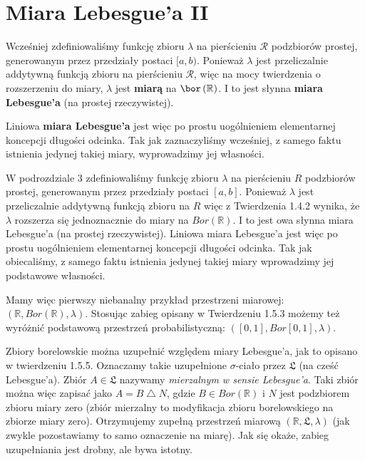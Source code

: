 \section{Miara Lebesgue'a II}

Wcześniej zdefiniowaliśmy funkcję zbioru $\lambda$ na pierścieniu $\mathcal{R}$ podzbiorów prostej, generowanym przez przedziały postaci $[a,b)$. Ponieważ $\lambda$ jest przeliczalnie addytywną funkcją zbioru na pierścieniu  $\mathcal{R}$, więc na mocy twierdzenia o rozszerzeniu do miary,  $\lambda$ jest \textbf{miarą} na  $\bor\left(\mathbb{R} \right) $. I to jest słynna \textbf{miara Lebesgue'a} (na prostej rzeczywistej).

Liniowa \textbf{miara Lebesgue'a} jest więc po prostu uogólnieniem elementarnej koncepcji długości odcinka. Tak jak zaznaczyliśmy wcześniej, z samego faktu istnienia jedynej takiej miary, wyprowadzimy jej własności.


W podrozdziale 3 zdefiniowaliśmy funkcję zbioru \( \lambda \) na pierścieniu \( R \) podzbiorów prostej, generowanym przez przedziały postaci \( [a, b] \). Ponieważ \( \lambda \) jest przeliczalnie addytywną funkcją zbioru na \( R \) więc z Twierdzenia 1.4.2 wynika, że \( \lambda \) rozszerza się jednoznacznie do miary na \( Bor(\mathbb{R}) \). I to jest owa słynna miara Lebesgue’a (na prostej rzeczywistej). Liniowa miara Lebesgue’a jest więc po prostu uogólnieniem elementarnej koncepcji długości odcinka. Tak jak obiecaliśmy, z samego faktu istnienia jedynej takiej miary wprowadzimy jej podstawowe własności.

Mamy więc pierwszy niebanalny przykład przestrzeni miarowej: \( (\mathbb{R}, Bor(\mathbb{R}), \lambda) \). Stosując zabieg opisany w Twierdzeniu 1.5.3 możemy też wyróżnić podstawową przestrzeń probabilistyczną: \( ([0, 1], Bor[0, 1], \lambda) \).

Zbiory borelowskie można uzupełnić względem miary Lebesgue’a, jak to opisano w twierdzeniu 1.5.5. Oznaczamy takie uzupełnione $\sigma $-ciało przez \( \mathfrak{L} \) (na cześć Lebesgue’a). Zbiór \( A \in \mathfrak{L} \) nazywamy \textit{mierzalnym w sensie Lebesgue’a}. Taki zbiór można więc zapisać jako \( A = B \bigtriangleup N \), gdzie \( B \in Bor(\mathbb{R}) \) i \( N \) jest podzbiorem zbioru miary zero (zbiór mierzalny to modyfikacja zbioru borelowskiego na zbiorze miary zero). Otrzymujemy zupełną przestrzeń miarową \( (\mathbb{R}, \mathfrak{L}, \lambda) \) (jak zwykle pozostawiamy to samo oznaczenie na miarę). Jak się okaże, zabieg uzupełniania jest drobny, ale bywa istotny.

